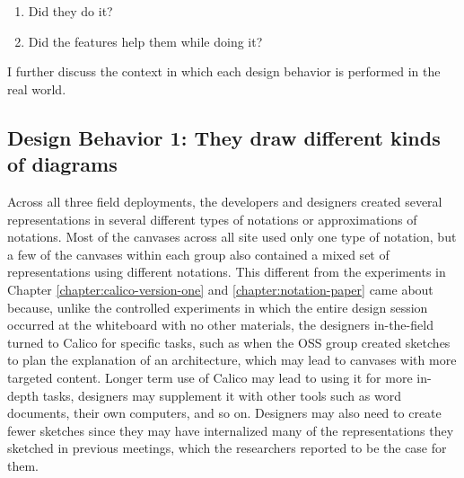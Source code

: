 \begin{enumerate}
	\item Did they do it?
	\item Did the features help them while doing it?
\end{enumerate}

I further discuss the context in which each design behavior is performed in the real world.

\subsection{Design Behavior 1: They draw different kinds of diagrams}

Across all three field deployments, the developers and designers created several representations in several different types of notations or approximations of notations. Most of the canvases across all site used only one type of notation, but a few of the canvases within each group also contained a mixed set of representations using different notations. This different from the experiments in Chapter \ref{chapter:calico-version-one} and \ref{chapter:notation-paper} came about because, unlike the controlled experiments in which the entire design session occurred at the whiteboard with no other materials, the designers in-the-field turned to Calico for specific tasks, such as when the OSS group created sketches to plan the explanation of an architecture, which may lead to canvases with more targeted content. Longer term use of Calico may lead to using it for more in-depth tasks, designers may supplement it with other tools such as word documents, their own computers, and so on. Designers may also need to create fewer sketches since they may have internalized many of the representations they sketched in previous meetings, which the researchers reported to be the case for them.

